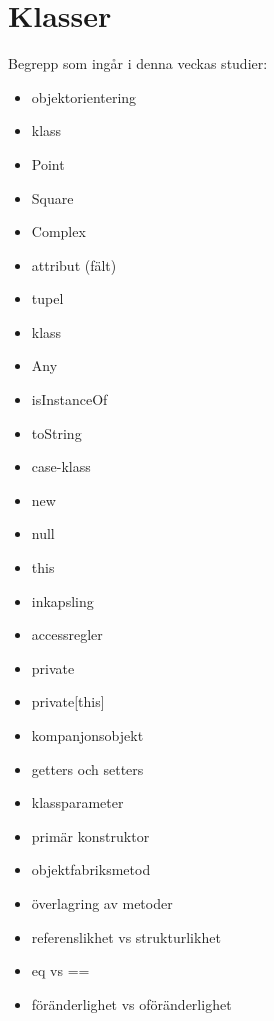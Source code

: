 \chapter{Klasser}\label{chapter:W05}
Begrepp som ingår i denna veckas studier:
\begin{itemize}[noitemsep,label={$\square$},leftmargin=*]
\item objektorientering
\item klass
\item Point
\item Square
\item Complex
\item attribut (fält)
\item tupel
\item klass
\item Any
\item isInstanceOf
\item toString
\item case-klass
\item new
\item null
\item this
\item inkapsling
\item accessregler
\item private
\item private[this]
\item kompanjonsobjekt
\item getters och setters
\item klassparameter
\item primär konstruktor
\item objektfabriksmetod
\item överlagring av metoder
\item referenslikhet vs strukturlikhet
\item eq vs ==
\item föränderlighet vs oföränderlighet\end{itemize}
